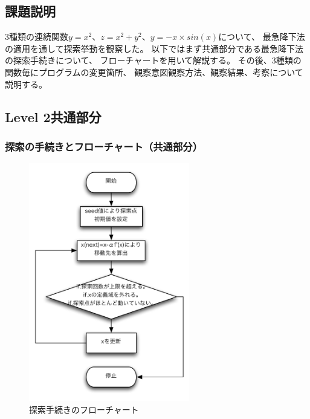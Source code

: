 \subsection{課題説明}
3種類の連続関数$y=x^2$、$z=x^2+y^2$、$y=-x \times sin(x)$について、
最急降下法の適用を通して探索挙動を観察した。
以下ではまず共通部分である最急降下法の探索手続きについて、
フローチャートを用いて解説する。
その後、3種類の関数毎にプログラムの変更箇所、
観察意図観察方法、観察結果、考察について説明する。
\subsection{Level 2共通部分}

\subsubsection{探索の手続きとフローチャート（共通部分）}
\begin{figure}[htbp]
  \begin{center}
    \includegraphics[clip,width=7.0cm]{./figs/tonal1.pdf}
    \caption{探索手続きのフローチャート}
 \end{center}
\end{figure}
